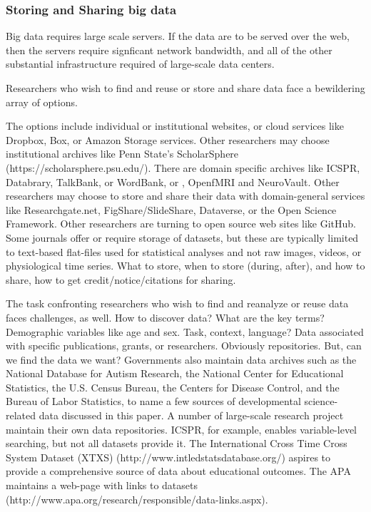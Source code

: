\documentclass[letterpaper,man,apacite]{apa6}
\begin{document}
\subsubsection{Storing and Sharing big data}

Big data requires large scale servers.
If the data are to be served over the web, then the servers require signficant network bandwidth, and all of the other substantial infrastructure required of large-scale data centers.

Researchers who wish to find and reuse or store and share data face a bewildering array of options.


The options include individual or institutional websites, or cloud services like Dropbox, Box, or Amazon Storage services.
Other researchers may choose institutional archives like Penn State's ScholarSphere (https://scholarsphere.psu.edu/).
There are domain specific archives like ICSPR, Databrary, TalkBank, or WordBank, or , OpenfMRI and NeuroVault.
Other researchers may choose to store and share their data with domain-general services like Researchgate.net, FigShare/SlideShare, Dataverse, or the Open Science Framework.
Other researchers are turning to open source web sites like GitHub.
Some journals offer or require storage of datasets, but these are typically limited to text-based flat-files used for statistical analyses and not raw images, videos, or physiological time series.
What to store, when to store (during, after), and how to share, how to get credit/notice/citations for sharing.


The task confronting researchers who wish to find and reanalyze or reuse data faces challenges, as well.
How to discover data?
What are the key terms? Demographic variables like age and sex. Task, context, language?
Data associated with specific publications, grants, or researchers.
Obviously repositories.
But, can we find the data we want?
Governments also maintain data archives such as the National Database for Autism Research, the National Center for Educational Statistics, the U.S. Census Bureau, the Centers for Disease Control, and the Bureau of Labor Statistics, to name a few sources of developmental science-related data discussed in this paper.
A number of large-scale research project maintain their own data repositories.
ICSPR, for example, enables variable-level searching, but not all datasets provide it.
The International Cross Time Cross System Dataset (XTXS) (http://www.intledstatsdatabase.org/) aspires to provide a comprehensive source of data about educational outcomes.
The APA maintains a web-page with links to datasets (http://www.apa.org/research/responsible/data-links.aspx).
\end{document}

